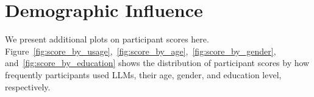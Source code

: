 \section{Demographic Influence}\label{app:additional_analysis}
We present additional plots on participant scores here. Figure~\ref{fig:score_by_usage},~\ref{fig:score_by_age},~\ref{fig:score_by_gender}, and~\ref{fig:score_by_education} shows the distribution of participant scores by how frequently participants used LLMs, their age, gender, and education level, respectively.


